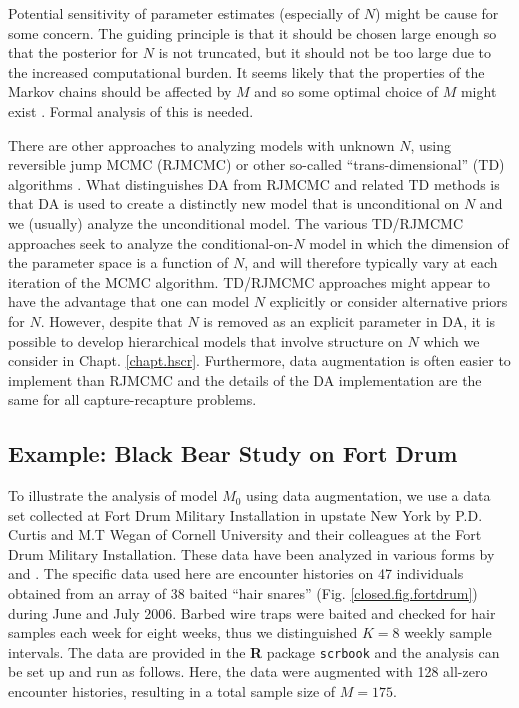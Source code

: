 Potential sensitivity of parameter estimates (especially of $N$) might
be cause for some concern.
The guiding principle is
that it should be chosen large enough so that the posterior for $N$ is
not truncated, but it should not be too large due to the increased 
computational burden. It seems likely that the properties of the
Markov chains should be affected by $M$ and so some optimal choice of
$M$ might exist \citep{gopalaswamy:2012}.
Formal analysis of this is needed.

There are other approaches to analyzing models with unknown $N$, using
reversible jump MCMC (RJMCMC) or other so-called ``trans-dimensional''
(TD) algorithms \citep{king_brooks:2001, durban_elston:2005,
  king_etal:2008, schofield_barker:2008, wright_etal:2009}.  What
distinguishes DA from RJMCMC and related TD methods is that DA is used
to create a distinctly new model that is unconditional on $N$ and we
(usually) analyze the unconditional model. The various TD/RJMCMC
approaches seek to analyze the conditional-on-$N$ model in which the
dimension of the parameter space is a function of $N$, and will
therefore typically vary at each iteration of the MCMC
algorithm. TD/RJMCMC approaches might appear to have the advantage
that one can model $N$ explicitly or consider alternative priors for
$N$. However, despite that $N$ is removed as an explicit parameter in
DA, it is possible to develop hierarchical models that involve
structure on $N$ \citep{converse_royle:2010, royle_etal:2011ms} which
we consider in Chapt. \ref{chapt.hscr}. Furthermore, data augmentation
is often easier to implement than RJMCMC and the details of the
DA implementation are the same for all capture-recapture problems.


\subsection{Example: Black Bear Study on Fort Drum}

To illustrate the analysis of model $M_0$ using data augmentation, we use
a data set collected at Fort Drum Military Installation in upstate New
York by P.D. Curtis and M.T Wegan of Cornell University and
their colleagues at the Fort Drum Military Installation.
These data have been analyzed in various forms by
\citet{wegan:2008,gardner_etal:2009} and \citet{gardner_etal:2010jwm}.
The specific data used here are encounter histories on 47 individuals
obtained from an array of 38 baited ``hair snares''
(Fig. \ref{closed.fig.fortdrum}) during June and July 2006.  Barbed wire
traps were baited and checked for hair samples each week for eight
weeks, thus we distinguished $K=8$ weekly sample intervals. The data are provided
in the {\bf R} package \mbox{\tt scrbook}
and the analysis can be set up and run as
follows. Here, the data were augmented with 128
all-zero encounter histories, resulting in a total sample size of $M=175$.

